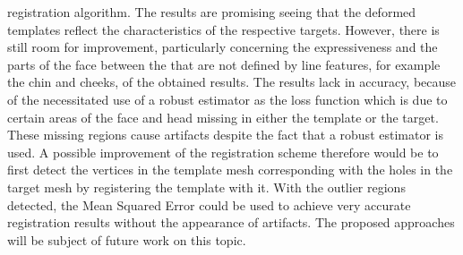 registration algorithm. The results are promising seeing that the deformed templates reflect the characteristics of the respective targets. However, there is still room for improvement, particularly concerning the expressiveness and the parts of the face between the that are not defined by line features, for example the chin and cheeks, of the obtained results. The results lack in accuracy, because of the necessitated use of a robust estimator as the loss function which is
due to certain areas of the face and head missing in either the template or the target. These missing regions cause artifacts despite the fact that a robust estimator is used. A possible improvement of the registration scheme therefore would be to first detect the vertices in the template mesh corresponding with the holes in the target mesh by registering the template with it. With the outlier regions detected, the Mean Squared Error could be used to achieve very accurate registration results without the appearance of artifacts. The proposed approaches will be subject of future work on this topic.\\  

\begin{comment}
Tried out regularization
mount of basis functions
Adpation of the optimization scheme. 
squared exponential covariance function, for example to make it less smooth and give it a smaller domain.
The use of vector-valued Gaussian Processes can be further adapted to 3D face registration by either changing the covariance function or tweaking the parameters of the  Of course, the expressiveness and exact modelling in the feature regions of the fits has to be enhanced as
In order to the pipeline to yield near-perfect results Gaussian Process Regression and the optimization process have to be further adapted an improved. In essence, the imperative must be to find a good balance of parameter settings in the covariance function, the parametric representation of the Gaussian Process Posterior and the loss function.

In conclusion, the presented approach to 3D face registration successfully incorporated line features to establish correspondence which lead to more expressive and accurate registration results.

\end{comment}

